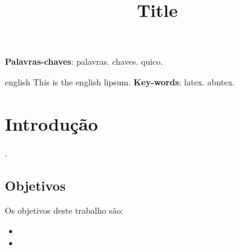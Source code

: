 \documentclass{utfpr-pg}
\title{Title}
\begin{document}
\frenchspacing

\imprimircapa
\imprimirfolhaderosto

\begin{resumo}
  \autocitacao
   \lipsum[23]
   \vspace{\onelineskip}
   \noindent
   \textbf{Palavras-chaves}: palavras. chaves. quico.
 \end{resumo}

 \begin{resumo}[Abstract]
   \begin{otherlanguage*}{english}
     \autocitacao[en]
     This is the english lipsum. \lipsum[2]
     \vspace{\onelineskip}
     \noindent
     \textbf{Key-words}: latex. abntex.
   \end{otherlanguage*}
 \end{resumo}






\tableofcontents*
\cleardoublepage

\textual

\chapter{Introdução}
\lipsum[1]
\cite{kwiatkowska_probabilistic_2002}.

\section{Objetivos}
Os objetivos deste trabalho são:
\begin{itemize}
\item \lipsum[2]
\item \lipsum[3]
\end{itemize}
\end{document}
